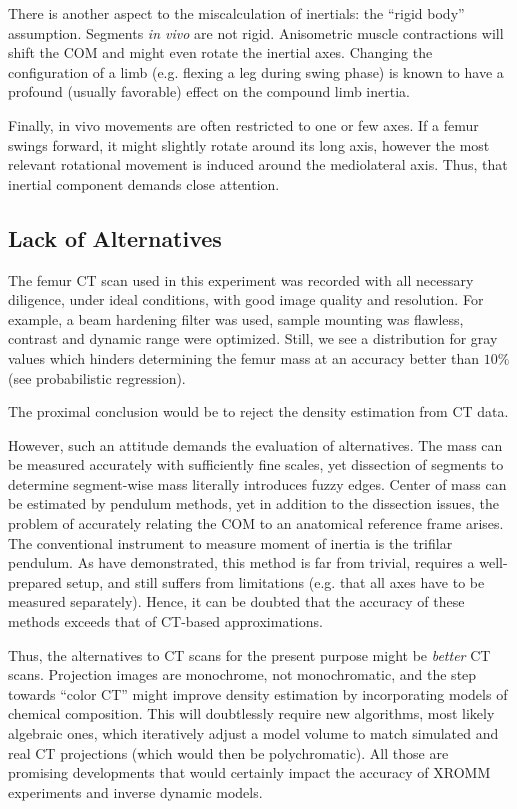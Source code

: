 There is another aspect to the miscalculation of inertials: the ``rigid body'' assumption.
Segments \emph{in vivo} are not rigid.
Anisometric muscle contractions will shift the COM and might even rotate the inertial axes.
Changing the configuration of a limb (e.g. flexing a leg during swing phase) is known to have a profound (usually favorable) effect on the compound limb inertia.

Finally, in vivo movements are often restricted to one or few axes.
If a femur swings forward, it might slightly rotate around its long axis, however the most relevant rotational movement is induced around the mediolateral axis.
Thus, that inertial component demands close attention.


\subsection{Lack of Alternatives}
\label{sec:orgded80b0}
The femur CT scan used in this experiment was recorded with all necessary diligence, under ideal conditions, with good image quality and resolution.
For example, a beam hardening filter was used, sample mounting was flawless, contrast and dynamic range were optimized.
Still, we see a distribution for gray values which hinders determining the femur mass at an accuracy better than \(10\%\) (see probabilistic regression).

The proximal conclusion would be to reject the density estimation from CT data.


However, such an attitude demands the evaluation of alternatives.
The mass can be measured accurately with sufficiently fine scales, yet dissection of segments to determine segment-wise mass literally introduces fuzzy edges.
Center of mass can be estimated by pendulum methods, yet in addition to the dissection issues, the problem of accurately relating the COM to an anatomical reference frame arises.
The conventional instrument to measure moment of inertia is the trifilar pendulum.
As \citet{Durston2022} have demonstrated, this method is far from trivial, requires a well-prepared setup, and still suffers from limitations (e.g. that all axes have to be measured separately).
Hence, it can be doubted that the accuracy of these methods exceeds that of CT-based approximations.

Thus, the alternatives to CT scans for the present purpose might be \emph{better} CT scans.
Projection images are monochrome, not monochromatic, and the step towards ``color CT'' might improve density estimation by incorporating models of chemical composition.
This will doubtlessly require new algorithms, most likely algebraic ones, which iteratively adjust a model volume to match simulated and real CT projections (which would then be polychromatic).
All those are promising developments that would certainly impact the accuracy of XROMM experiments and inverse dynamic models.


